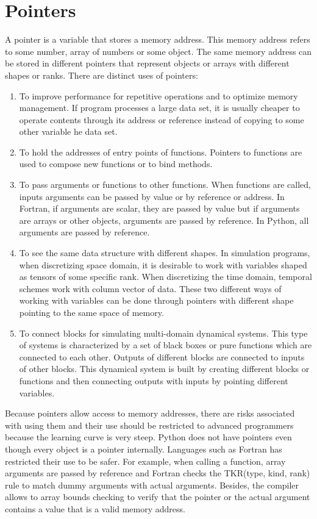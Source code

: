     \newpage 
    \section{Pointers} 

A pointer is a variable that stores a memory address. 
This memory address refers to some number, array of numbers or some object. 
The same memory address can be stored in different pointers that represent  
objects or arrays with different shapes or ranks. 
There are  distinct uses of pointers: 
\begin{enumerate}
\item To improve performance for repetitive operations and to optimize memory management. 
If program processes a large data set, it is usually cheaper to operate contents through 
its address or reference instead of copying to some other variable he data set. 
\item To hold the addresses of entry points of functions. Pointers to functions 
are used to compose new functions or to bind methods. 
\item To pass arguments or functions to other functions.
When functions are called, inputs arguments can be passed by value or by reference or address. 
In Fortran, if arguments are scalar, they are passed by value but if arguments are arrays or other objects, 
arguments are passed by reference. 
In Python, all arguments are passed by reference. 
\item To see the same data structure  with different shapes. 
In simulation programs, when discretizing space domain, 
it is desirable to work  with variables shaped as tensors of some specific rank. 
When discretizing the time domain, temporal schemes work with column vector of data. 
These two different ways of working with variables can be done through pointers with different shape pointing to
the same space of memory. 
\item To connect blocks for simulating multi-domain dynamical systems. 
This type of systems is characterized by a set of black boxes or pure functions which are connected to 
each other. Outputs of different blocks are connected to inputs of other blocks. 
This dynamical system is built by creating different blocks or functions and then  
connecting outputs with inputs by pointing different variables. 

\end{enumerate}
Because pointers allow access to memory addresses, 
there are risks associated with using them and their use should be restricted to advanced 
programmers because the learning curve is very steep. 
Python does not have pointers even though every object is a pointer internally. 
Languages such as Fortran has restricted their use to be safer. For example, 
when calling a function, array arguments are passed by reference and
Fortran checks the TKR(type, kind, rank) rule to match dummy arguments with actual 
arguments. Besides, the compiler allows to array bounds checking
to verify that the pointer or the actual argument contains 
a value that is a valid memory address.


